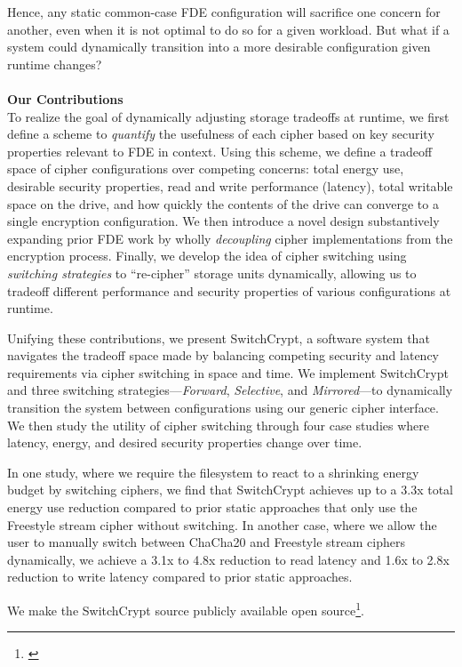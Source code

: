 Hence, any static common-case FDE configuration will sacrifice one
concern for another, even when it is not optimal to do so for a given
workload. But what if a system could dynamically transition into a
more desirable configuration given
runtime changes?\\
\\
\textbf{Our Contributions}\\
To realize the goal of dynamically adjusting storage tradeoffs at
runtime, we first define a scheme to \emph{quantify} the usefulness of
each cipher based on key security properties relevant to FDE in
context. Using this scheme, we define a tradeoff space of cipher
configurations over competing concerns: total energy use, desirable
security properties, read and write performance (latency), total
writable space on the drive, and how quickly the contents of the drive
can converge to a single encryption configuration. We then introduce a
novel design substantively expanding prior FDE work by wholly
\emph{decoupling} cipher implementations from the encryption process.
Finally, we develop the idea of cipher switching using \emph{switching
  strategies} to ``re-cipher'' storage units dynamically, allowing us
to tradeoff different performance and security properties of various
configurations at runtime. 

Unifying these contributions, we present SwitchCrypt, a software system that
navigates the tradeoff space made by balancing competing security and latency
requirements via cipher switching in space and time. We implement SwitchCrypt
and three switching strategies---\emph{Forward}, \emph{Selective}, and
\emph{Mirrored}---to dynamically transition the system between configurations
using our generic cipher interface. We then study the utility of cipher
switching through four case studies where latency, energy, and desired security
properties change over time.

In one study, where we require the filesystem to react to a shrinking energy
budget by switching ciphers, we find that SwitchCrypt achieves up to a 3.3x
total energy use reduction compared to prior static approaches that only use the
Freestyle stream cipher without switching. In another case, where we allow the
user to manually switch between ChaCha20 and Freestyle stream ciphers
dynamically, we achieve a 3.1x to 4.8x reduction to read latency and 1.6x to
2.8x reduction to write latency compared to prior static approaches.

We make the SwitchCrypt source publicly available open
source\footnote{\label{note1}\SystemURI}.
